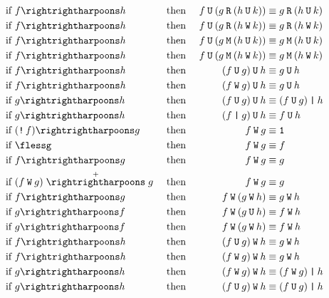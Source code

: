 \documentclass[a4paper,twoside,10pt,DIV=12]{scrreprt}
\newcommand{\U}{\mathbin{\texttt{U}}}
\newcommand{\R}{\mathbin{\texttt{R}}}
\newcommand{\M}{\mathbin{\texttt{M}}}
\newcommand{\W}{\mathbin{\texttt{W}}}
\DeclareMathOperator{\NOT}{\texttt{!}}
\newcommand{\OR}{\mathbin{\texttt{|}}}
\newcommand{\0}{\texttt{0}}
\newcommand{\1}{\texttt{1}}
\def\simp{\rightrightharpoons}
\def\Simp{\stackrel{+}{\simp}}
\begin{document}
\begin{alignat*}{3}
\text{if~} & f\simp h        &  & \text{~then~} & f\U (g \R (h \U k)) & \equiv g \R (h \U k)      \\
\text{if~} & f\simp h        &  & \text{~then~} & f\U (g \R (h \W k)) & \equiv g \R (h \W k)      \\
\text{if~} & f\simp h        &  & \text{~then~} & f\U (g \M (h \U k)) & \equiv g \M (h \U k)      \\
\text{if~} & f\simp h        &  & \text{~then~} & f\U (g \M (h \W k)) & \equiv g \M (h \W k)      \\
\text{if~} & f\simp h        &  & \text{~then~} & (f\U g) \U h        & \equiv g \U h             \\
\text{if~} & f\simp h        &  & \text{~then~} & (f\W g) \U h        & \equiv g \U h             \\
\text{if~} & g\simp h        &  & \text{~then~} & (f\U g) \U h        & \equiv (f \U g) \OR h     \\
\text{if~} & g\simp h        &  & \text{~then~} & (f\OR g) \U h       & \equiv f \U h             \\
\text{if~} & (\NOT f)\simp g &  & \text{~then~} & f\W g               & \equiv \1                 \\
\text{if~} & \flessg         &  & \text{~then~} & f\W g               & \equiv f                  \\
\text{if~} & f\simp g        &  & \text{~then~} & f\W g               & \equiv g                  \\
\text{if~} & (f\W g)\Simp g  &  & \text{~then~} & f\W g               & \equiv g                  \\
\text{if~} & f\simp g        &  & \text{~then~} & f\W (g \W h)        & \equiv g \W h             \\
\text{if~} & g\simp f        &  & \text{~then~} & f\W (g \U h)        & \equiv f \W h             \\
\text{if~} & g\simp f        &  & \text{~then~} & f\W (g \W h)        & \equiv f \W h             \\
\text{if~} & f\simp h        &  & \text{~then~} & (f\U g) \W h        & \equiv g \W h             \\
\text{if~} & f\simp h        &  & \text{~then~} & (f\W g) \W h        & \equiv g \W h             \\
\text{if~} & g\simp h        &  & \text{~then~} & (f\W g) \W h        & \equiv (f \W g) \OR h     \\
\text{if~} & g\simp h        &  & \text{~then~} & (f\U g) \W h        & \equiv (f \U g) \OR h     \\

\end{alignat*}
\end{document}
